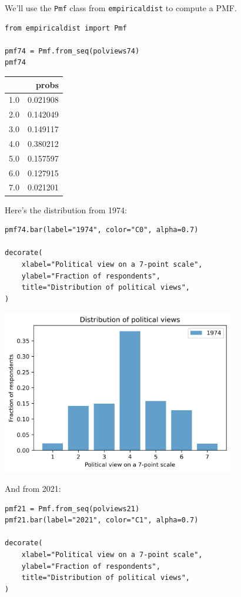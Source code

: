 We'll use the \passthrough{\lstinline!Pmf!} class from
\passthrough{\lstinline!empiricaldist!} to compute a PMF.

\begin{lstlisting}[]
from empiricaldist import Pmf

pmf74 = Pmf.from_seq(polviews74)
pmf74
\end{lstlisting}

\begin{tabular}{lr}
\midrule
{} &     probs \\
\midrule
1.0 &  0.021908 \\
2.0 &  0.142049 \\
3.0 &  0.149117 \\
4.0 &  0.380212 \\
5.0 &  0.157597 \\
6.0 &  0.127915 \\
7.0 &  0.021201 \\
\midrule
\end{tabular}

Here's the distribution from 1974:

\begin{lstlisting}[]
pmf74.bar(label="1974", color="C0", alpha=0.7)

decorate(
    xlabel="Political view on a 7-point scale",
    ylabel="Fraction of respondents",
    title="Distribution of political views",
)
\end{lstlisting}

\begin{center}
\includegraphics[width=4in]{chapters/02_polviews_soln_files/02_polviews_soln_32_0.png}
\end{center}

And from 2021:

\begin{lstlisting}[]
pmf21 = Pmf.from_seq(polviews21)
pmf21.bar(label="2021", color="C1", alpha=0.7)

decorate(
    xlabel="Political view on a 7-point scale",
    ylabel="Fraction of respondents",
    title="Distribution of political views",
)
\end{lstlisting}

